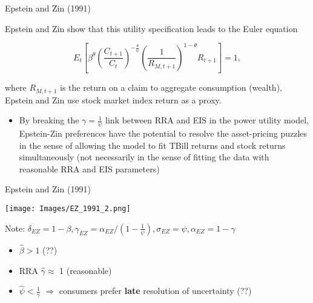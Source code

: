 \documentclass[xcolor=table, aspectratio=169]{beamer}
\newcommand{\alertbf}[1]{\alert{\textbf{#1}}}
\begin{document}
\begin{frame}{Epstein and Zin (1991)}

Epstein and Zin show that this utility specification leads to the Euler equation

$$ E_t \left[ \beta^\theta \left(\frac{C_{t+1}}{C_t}\right)^{-\frac{\theta}{\psi}} \left(\frac{1}{R_{M,t+1}}\right) ^{1-\theta} R_{t+1}\right] = 1,$$

where $R_{M,t+1}$ is the return on a claim to aggregate consumption (wealth), Epstein and Zin use stock market index return as a proxy.

\begin{itemize}

\item By breaking the $\gamma = \frac{1}{\psi}$ link between RRA and EIS in the power utility model, Epstein-Zin preferences have the potential to resolve the asset-pricing puzzles in the sense of allowing the model to fit TBill returns and stock returns simultaneously (not necessarily in the sense of fitting the data with reasonable RRA and EIS parameters)

\end{itemize}
\end{frame}

\begin{frame}{Epstein and Zin (1991)}
\begin{center}
\texttt{[image: Images/EZ\_1991\_2.png]}
\end{center}

Note: $\delta_{EZ} = 1-\beta, \gamma_{EZ} = \alpha_{EZ}/(1-\frac{1}{\psi}), \sigma_{EZ} = \psi, \alpha_{EZ} = 1- \gamma$
\begin{itemize}
\item $\hat{\beta} > 1$ (??)
\item RRA $\hat{\gamma} \approx$ 1 (reasonable)
\item $\hat{\psi} < \frac{1}{\gamma}$ $\Rightarrow$ consumers prefer \alertbf{late} resolution of uncertainty (??)
\end{itemize}
\end{frame}
\end{document}
